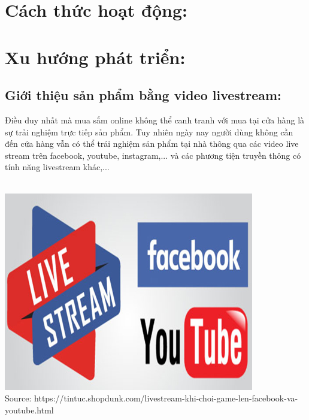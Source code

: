 \documentclass[13pt,a4paper]{article}
\begin{document}
\section{Cách thức hoạt động:} 
\section{Xu hướng phát triển:}
    \subsection{Giới thiệu sản phẩm bằng video livestream:}
    Điều duy nhất mà mua sắm online không thể canh tranh với mua tại cửa hàng là sự trải nghiệm trực tiếp sản phẩm. Tuy nhiên ngày nay người dùng không cần đến cửa hàng vẫn có thể trải nghiệm sản phẩm tại nhà thông qua các video live stream trên facebook, youtube, instagram,... và các phương tiện truyền thông có tính năng livestream khác,...\\
    \\\begin{center}
    \includegraphics[scale=0.7]{images/f&u.png} \\
    \fontsize{10pt}{1.2pt}\selectfont
    Source: https://tintuc.shopdunk.com/livestream-khi-choi-game-len-facebook-va-youtube.html
    \end{center}
\end{document}
